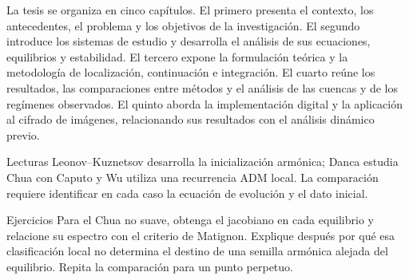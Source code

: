 La tesis se organiza en cinco capítulos. El primero presenta el contexto,
los antecedentes, el problema y los objetivos de la investigación.
El segundo introduce los sistemas de estudio y desarrolla el análisis
de sus ecuaciones, equilibrios y estabilidad. El tercero expone la
formulación teórica y la metodología de localización, continuación e
integración. El cuarto reúne los resultados, las comparaciones entre
métodos y el análisis de las cuencas y de los regímenes observados.
El quinto aborda la implementación digital y la aplicación al cifrado
de imágenes, relacionando sus resultados con el análisis dinámico previo.

\ifHAFOPedagogy
\begin{bloqueestudio}{Lecturas}
Leonov--Kuznetsov desarrolla la inicialización armónica; Danca estudia
Chua con Caputo y Wu utiliza una recurrencia ADM local. La comparación
requiere identificar en cada caso la ecuación de evolución y el dato inicial.
\end{bloqueestudio}

\begin{bloqueestudio}{Ejercicios}
Para el Chua no suave, obtenga el jacobiano en cada equilibrio y relacione su
espectro con el criterio de Matignon. Explique después por qué esa
clasificación local no determina el destino de una semilla armónica alejada
del equilibrio. Repita la comparación para un punto perpetuo.
\end{bloqueestudio}
\fi
